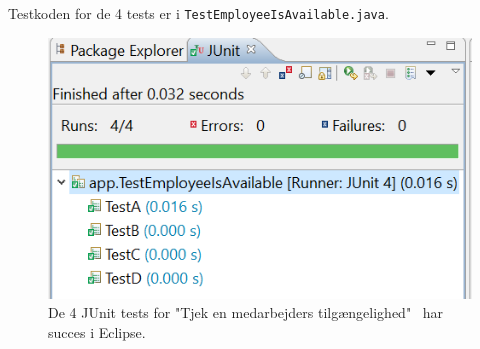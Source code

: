 Testkoden for de 4 tests er i \texttt{TestEmployeeIsAvailable.java}.

\begin{figure}[H]
    \centering
    \includegraphics[width = 0.5 \textwidth]{Figurer/whitebox4succes.PNG}
    \caption{De 4 JUnit tests for "Tjek en medarbejders tilgængelighed" $\,$ har succes i Eclipse.}
    \label{fig:whitebox4succes}
\end{figure}